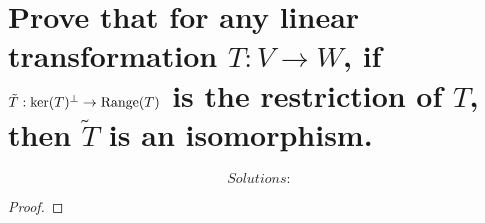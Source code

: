 \documentclass[../main.tex]{subfiles}
\begin{document}
\section[Bonus Problem]{Prove that for any linear transformation $T:V \to W$, if $\tilde{T}: {\rm ker}(T)^{\perp} \to {\rm Range}(T)$ is the restriction of $T$, then $\tilde{T}$ is an isomorphism. }
\begin{equation*}
        \boxed{ Solutions:}
\end{equation*}
\begin{proof}
\end{proof}
\end{document}
